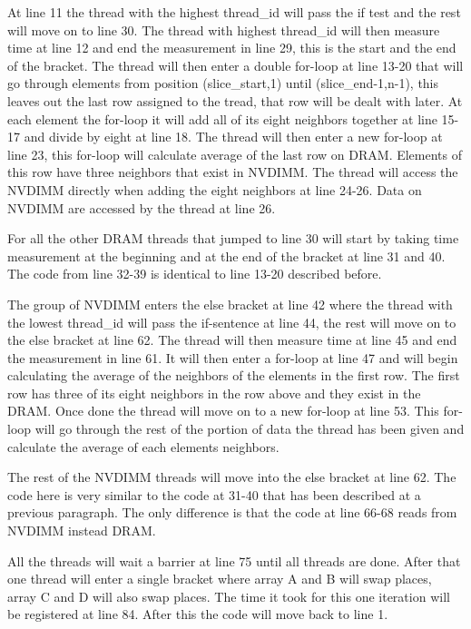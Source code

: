 \documentclass[12pt,a4paper,USenglish]{article}      %
\begin{document}
At line 11 the thread with the highest thread\_id will pass the if test and the rest will move on to line 30. The thread with highest thread\_id will then measure time at line 12 and end the measurement in line 29, this is the start and the end of the bracket. The thread will then enter a double for-loop at line 13-20 that will go through elements from position (slice\_start,1) until (slice\_end-1,n-1), this leaves out the last row assigned to the tread, that row will be dealt with later. At each element the for-loop it will add all of its eight neighbors together at line 15-17 and divide by eight at line 18.
The thread will then enter a new for-loop at line 23, this for-loop will calculate average of the last row on DRAM. Elements of this row have three neighbors that exist in NVDIMM. The thread will access the NVDIMM directly when adding the eight neighbors at line 24-26. Data on NVDIMM are accessed by the thread at line 26.

For all the other DRAM threads that jumped to line 30 will start by taking time measurement at the beginning and at the end of the bracket at line 31 and 40. The code from line 32-39 is identical to line 13-20 described before.

The group of NVDIMM enters the else bracket at line 42 where the thread with the lowest thread\_id will pass the if-sentence at line 44, the rest will move on to the else bracket at line 62. The thread will then measure time at line 45 and end the measurement in line 61.
It will then enter a for-loop at line 47 and will begin calculating the average of the neighbors of the elements in the first row. The first row has three of its eight neighbors in the row above and they exist in the DRAM.
Once done the thread will move on to a new for-loop at line 53. This for-loop will go through the rest of the portion of data the thread has been given and calculate the average of each elements neighbors.

The rest of the NVDIMM threads will move into the else bracket at line 62. The code here is very similar to the code at 31-40 that has been described at a previous paragraph. The only difference is that the code at line 66-68 reads from NVDIMM instead DRAM.

All the threads will wait a barrier at line 75 until all threads are done. After that one thread will enter a single bracket where array A and B will swap places, array C and D will also swap places. The time it took for this one iteration will be registered at line 84. After this the code will move back to line 1.
\end{document}
